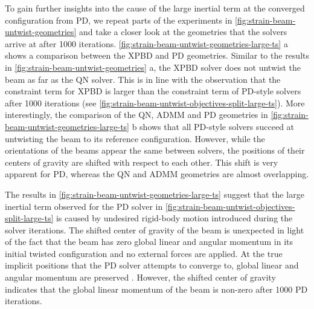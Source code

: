 To gain further insights into the cause of the large inertial term at the converged configuration from PD, we repeat parts of the 
experiments in \autoref{fig:strain-beam-untwist-geometries} and take a closer look at the geometries that the solvers arrive at after 1000 
iterations. \autoref{fig:strain-beam-untwist-geometries-large-ts} a shows a comparison between the XPBD and PD geometries. Similar to the 
results in \autoref{fig:strain-beam-untwist-geometries} a, the XPBD solver does not untwist the beam as far as the QN solver. This is in 
line with the observation that the constraint term for XPBD is larger than the constraint term of PD-style solvers after 1000 iterations (see 
\autoref{fig:strain-beam-untwist-objectives-split-large-ts}). More interestingly, the comparison of the QN, ADMM and PD geometries in 
\autoref{fig:strain-beam-untwist-geometries-large-ts} b shows that all PD-style solvers succeed at untwisting the beam to its reference 
configuration. However, while the orientations of the beams appear the same between solvers, the positions of their centers of gravity 
are shifted with respect to each other. This shift is very apparent for PD, whereas the QN and ADMM geometries are almost overlapping.

The results in \autoref{fig:strain-beam-untwist-geometries-large-ts} suggest that the large inertial term observed for the PD solver in 
\autoref{fig:strain-beam-untwist-objectives-split-large-ts} is caused by undesired rigid-body motion introduced during the solver iterations. 
The shifted center of gravity of the beam is unexpected in light of the fact that the beam has zero global linear and angular momentum in 
its initial twisted configuration and no external forces are applied. At the true implicit positions that the PD solver attempts to converge to, global 
linear and angular momentum are preserved \cite{bouaziz2014}. However, the shifted center of gravity indicates that the global linear 
momentum of the beam is non-zero after 1000 PD iterations.

